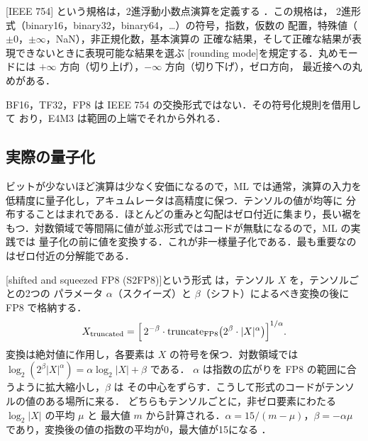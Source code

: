 \documentclass[../main.tex]{subfiles}
\begin{document}
\begin{definition}
  [IEEE 754] という規格は，2進浮動小数点演算を定義する
  \cite{ieee754-2019}．この規格は，
  2進形式（binary16，binary32，binary64，\ldots）の符号，指数，仮数の
  配置，特殊値（$\pm 0$，$\pm\infty$，NaN），非正規化数，基本演算の
  正確な結果，そして正確な結果が表現できないときに表現可能な結果を選ぶ
  [rounding mode]を規定する．丸めモードには
  $+\infty$ 方向（切り上げ），$-\infty$ 方向（切り下げ），ゼロ方向，
  最近接への丸めがある．
\end{definition}

%
BF16，TF32，FP8 は IEEE 754 の交換形式ではない．その符号化規則を借用して
おり，E4M3 は範囲の上端でそれから外れる．

\subsection{実際の量子化}

ビットが少ないほど演算は少なく安価になるので，ML では通常，演算の入力を
低精度に量子化し，アキュムレータは高精度に保つ．テンソルの値が均等に
分布することはまれである．ほとんどの重みと勾配はゼロ付近に集まり，長い裾を
もつ．対数領域で等間隔に値が並ぶ形式ではコードが無駄になるので，ML の実践では
量子化の前に値を変換する．これが非一様量子化である．最も重要なのはゼロ付近の分解能である．

\begin{definition}[S2FP8]
  [shifted and squeezed FP8 (S2FP8)]という形式
  \cite{cambier2020s2fp8} は，テンソル $X$ を，テンソルごとの2つの
  パラメータ $\alpha$（スクイーズ）と $\beta$（シフト）によるべき変換の後に
  FP8 で格納する．
  \begin{equation}
    X_{\text{truncated}} =
    \Bigl[\, 2^{-\beta} \cdot
      \mathrm{truncate}_{\text{FP8}}\bigl(2^{\beta} \cdot |X|^{\alpha}\bigr)
    \Bigr]^{1/\alpha} .
    \label{eq:l12-s2fp8}
  \end{equation}
  変換は絶対値に作用し，各要素は $X$ の符号を保つ．対数領域では
  $\log_2 (2^{\beta} |X|^{\alpha}) = \alpha \log_2 |X| + \beta$ である．
  $\alpha$ は指数の広がりを FP8 の範囲に合うように拡大縮小し，$\beta$ は
  その中心をずらす．こうして形式のコードがテンソルの値のある場所に来る．
  どちらもテンソルごとに，非ゼロ要素にわたる $\log_2 |X|$ の平均 $\mu$ と
  最大値 $m$ から計算される．$\alpha = 15/(m - \mu)$，$\beta = -\alpha\mu$
  であり，変換後の値の指数の平均が0，最大値が15になる
  \cite[§3.2]{cambier2020s2fp8}．
\end{definition}
\end{document}
